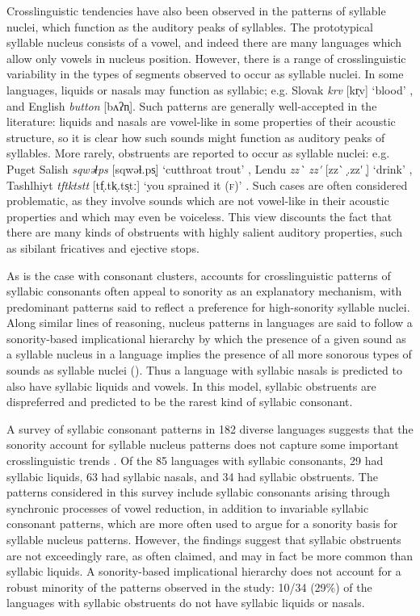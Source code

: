   Crosslinguistic tendencies have also been observed in the patterns of syllable nuclei, which function as the auditory peaks of syllables. The prototypical syllable nucleus consists of a vowel, and indeed there are many languages which allow only vowels in nucleus position. However, there is a range of crosslinguistic variability in the types of segments observed to occur as syllable nuclei. In some languages, liquids or nasals may function as syllabic; e.g. Slovak \textit{krv} [kr̩v] ‘blood’ \citep[186]{Zec2007}, and English \textit{button} [bʌʔn̩]. Such patterns are generally well-accepted in the literature: liquids and nasals are vowel-like in some properties of their acoustic structure, so it is clear how such sounds might function as auditory peaks of syllables. More rarely, obstruents are reported to occur as syllable nuclei: e.g. Puget Salish \textit{sqwəɬps} [sqwəɬ.ps̩] ‘cutthroat trout’ \citep[62]{Hoard1978}, Lendu \textit{zz\`{} zz\'{} } [zz\`{} ̩.zz\'{} ̩] ‘drink’
  \citep[483]{Demolin2002}, Tashlhiyt \textit{tftktstt} [tf̩.tk̩.ts̩tː] ‘you sprained it (\textsc{f})’ \citep[332]{Ridouane2008}. Such cases are often considered problematic, as they involve sounds which are not vowel-like in their acoustic properties and which may even be voiceless. This view discounts the fact that there are many kinds of obstruents with highly salient auditory properties, such as sibilant fricatives and ejective stops.

  As is the case with consonant clusters, accounts for crosslinguistic patterns of syllabic consonants often appeal to sonority as an explanatory mechanism, with predominant patterns said to reflect a preference for high-sonority syllable nuclei. Along similar lines of reasoning, nucleus patterns in languages are said to follow a sonority-based implicational hierarchy by which the presence of a given sound as a syllable nucleus in a language implies the presence of all more sonorous types of sounds as syllable nuclei (\citealt{Blevins1995,Zec2007}). Thus a language with syllabic nasals is predicted to also have syllabic liquids and vowels. In this model, syllabic obstruents are dispreferred and predicted to be the rarest kind of syllabic consonant.

  A survey of syllabic consonant patterns in 182 diverse languages suggests that the sonority account for syllable nucleus patterns does not capture some important crosslinguistic trends \citep{Bell1978a}. Of the 85 languages with syllabic consonants, 29 had syllabic liquids, 63 had syllabic nasals, and 34 had syllabic obstruents. The patterns considered in this survey include syllabic consonants arising through synchronic processes of vowel reduction, in addition to invariable syllabic consonant patterns, which are more often used to argue for a sonority basis for syllable nucleus patterns. However, the findings suggest that syllabic obstruents are not exceedingly rare, as often claimed, and may in fact be more common than syllabic liquids. A sonority-based implicational hierarchy does not account for a robust minority of the patterns observed in the study: 10/34 (29\%) of the languages with syllabic obstruents do not have syllabic liquids or nasals.

